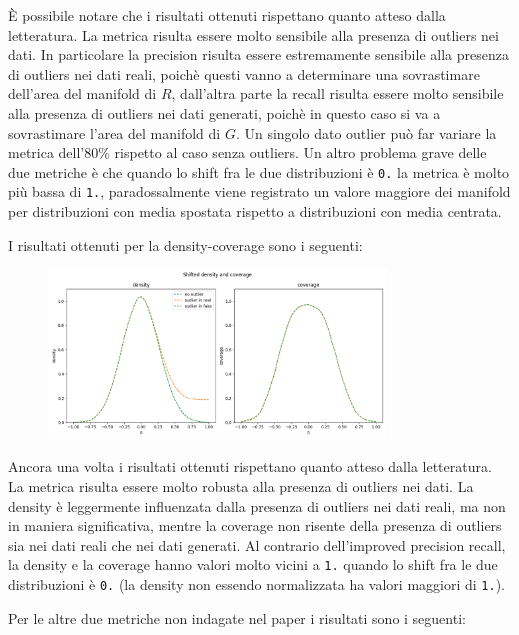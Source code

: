 È possibile notare che i risultati ottenuti rispettano quanto atteso dalla letteratura. La metrica risulta essere molto sensibile alla presenza di outliers nei dati.
In particolare la precision risulta essere estremamente sensibile alla presenza di outliers nei dati reali, poichè questi vanno a determinare una sovrastimare dell'area del manifold di \(R\), dall'altra parte 
la recall risulta essere molto sensibile alla presenza di outliers nei dati generati, poichè in questo caso si va a sovrastimare l'area del manifold di \(G\).
Un singolo dato outlier può far variare la metrica dell'80\% rispetto al caso senza outliers.
Un altro problema grave delle due metriche è che quando lo shift fra le due distribuzioni è \texttt{0.} la metrica è molto più bassa di \texttt{1.}, paradossalmente viene registrato un valore maggiore dei manifold per distribuzioni con media spostata rispetto a distribuzioni con media centrata.

I risultati ottenuti per la density-coverage sono i seguenti:

\begin{figure}[h!]
    \centering
    \includegraphics[width=0.8\textwidth]{../images/toyexperiments/outliers/shift_density_coverage.png} 
\end{figure}

Ancora una volta i risultati ottenuti rispettano quanto atteso dalla letteratura. La metrica risulta essere molto robusta alla presenza di outliers nei dati.
La density è leggermente influenzata dalla presenza di outliers nei dati reali, ma non in maniera significativa, mentre la coverage non risente della presenza di outliers sia nei dati reali che nei dati generati.
Al contrario dell'improved precision recall, la density e la coverage hanno valori molto vicini a \texttt{1.} quando lo shift fra le due distribuzioni è \texttt{0.} (la density non essendo normalizzata ha valori maggiori di \texttt{1.}).

Per le altre due metriche non indagate nel paper i risultati sono i seguenti:

